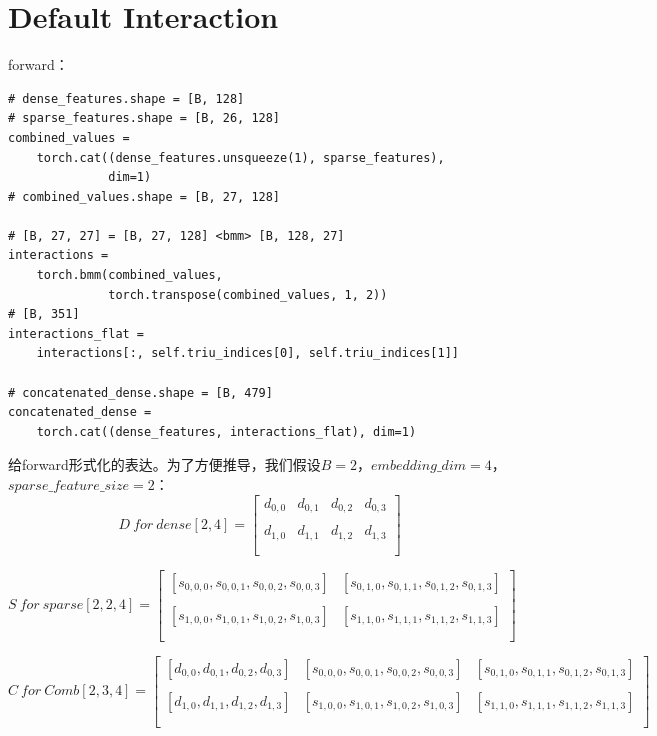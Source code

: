 \documentclass{article}
\begin{document}
\section{Default Interaction}
forward：
\lstset{language=Python}
\begin{lstlisting}
# dense_features.shape = [B, 128]
# sparse_features.shape = [B, 26, 128]
combined_values = 
    torch.cat((dense_features.unsqueeze(1), sparse_features),
              dim=1)
# combined_values.shape = [B, 27, 128]

# [B, 27, 27] = [B, 27, 128] <bmm> [B, 128, 27]
interactions = 
    torch.bmm(combined_values, 
              torch.transpose(combined_values, 1, 2))
# [B, 351]
interactions_flat = 
    interactions[:, self.triu_indices[0], self.triu_indices[1]]

# concatenated_dense.shape = [B, 479]
concatenated_dense = 
    torch.cat((dense_features, interactions_flat), dim=1)
\end{lstlisting}
给forward形式化的表达。为了方便推导，我们假设$B=2$，$embedding\_dim=4$，$sparse\_feature\_size=2$：
$$
D\ for\ dense [2, 4] =
\begin{bmatrix}
    d_{0,0} & d_{0,1} & d_{0,2} & d_{0,3} \\\\
    d_{1,0} & d_{1,1} & d_{1,2} & d_{1,3} \\\\
\end{bmatrix}
$$

$$
S\ for\ sparse [2, 2, 4] =
\begin{bmatrix}
    [s_{0,0,0},s_{0,0,1},s_{0,0,2},s_{0,0,3}] & [s_{0,1,0},s_{0,1,1},s_{0,1,2},s_{0,1,3}] \\\\
    [s_{1,0,0},s_{1,0,1},s_{1,0,2},s_{1,0,3}] & [s_{1,1,0},s_{1,1,1},s_{1,1,2},s_{1,1,3}] \\\\
\end{bmatrix}
$$

$$
C\ for\ Comb [2, 3, 4] =
\begin{bmatrix}
    [d_{0,0},d_{0,1},d_{0,2},d_{0,3}] & [s_{0,0,0},s_{0,0,1},s_{0,0,2},s_{0,0,3}] & [s_{0,1,0},s_{0,1,1},s_{0,1,2},s_{0,1,3}]\\\\
    [d_{1,0},d_{1,1},d_{1,2},d_{1,3}] & [s_{1,0,0},s_{1,0,1},s_{1,0,2},s_{1,0,3}] & [s_{1,1,0},s_{1,1,1},s_{1,1,2},s_{1,1,3}]\\\\
\end{bmatrix}
$$
\end{document}
